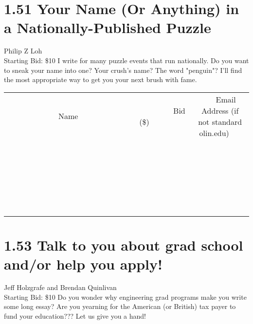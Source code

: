 \documentclass[11pt]{article}
\begin{document}
\section*{1.51 Your Name (Or Anything) in a Nationally-Published Puzzle}
Philip Z Loh
\\
Starting Bid: \$10
\newline
I write for many puzzle events that run nationally. Do you want to sneak your name into one? Your crush's name? The word "penguin"? I'll find the most appropriate way to get you your next brush with fame.
\\[6ex]
\begin{tabular}{c c c}
~~~~~~~~~~~~~Name~~~~~~~~~~~~~ & ~~~~~~~~~Bid (\$)~~~~~~~~~  & ~~~Email Address (if not standard olin.edu)~~~\\
 & & \\
\hline
 & & \\
\hline
 & & \\
\hline
 & & \\
\hline
 & & \\
\hline
 & & \\
\hline
 & & \\
\hline
 & & \\
\hline
 & & \\
\hline
 & & \\
\hline
 & & \\
\hline
 & & \\
\hline
 & & \\
\hline
 & & \\
\hline
 & & \\
\hline
 & & \\
\hline
 & & \\
\hline
 & & \\
\hline
 & & \\
\hline
 & & \\
\hline
 & & \\
\hline
 & & \\
\hline
 & & \\
\hline
 & & \\
\hline
 & & \\
\hline
 & & \\
\hline
\end{tabular}
\newpage
\section*{1.53 Talk to you about grad school and/or help you apply!}
Jeff Holzgrafe and Brendan Quinlivan
\\
Starting Bid: \$10
\newline
Do you wonder why engineering grad programs make you write some long essay? Are you yearning for the American (or British) tax payer to fund your education??? Let us give you a hand!
 
\end{document}
